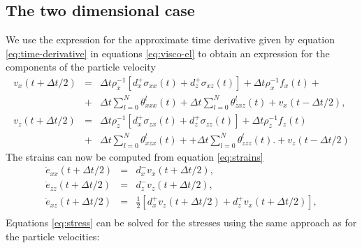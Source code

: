 \documentclass[11pt]{article}
\begin{document}
\subsection{The two dimensional case}
We use the expression for the approximate time derivative given by 
equation \eqref{eq:time-derivative}
in equations \eqref{eq:visco-el} to obtain an expression for the 
components of the particle velocity
\begin{eqnarray}
v_x(t+\Delta t/2) & = &  \Delta t\rho_x^{-1}\left[d^+_x \sigma_{xx}(t) 
                        +d^+_z \sigma_{xz}(t)\right] 
                        + \Delta t \rho_x^{-1}f_x(t) +            \nonumber\\ 
                  & + &  \Delta t \sum_{l=0}^N\theta^l_{xxx}(t) +   
                         \Delta t \sum_{l=0}^N\theta^l_{zxz}(t)
                        +v_x(t-\Delta t/2),\nonumber\\
v_z(t+\Delta t/2) & = &  \Delta t \rho_z^{-1}\left[d^+_x \sigma_{zx}(t) 
                        +d^+_z \sigma_{zz}(t)\right] 
                        +\Delta t \rho_z^{-1}f_z(t)\nonumber\\  
                  & + &  \Delta t\sum_{l=0}^N\theta^l_{xzx}(t) +  
                        +\Delta t\sum_{l=0}^N\theta^l_{zzz}(t)  \nonumber.
                        +v_z(t-\Delta t/2) 
                       \label{eq:vi-2d}
\end{eqnarray}
The strains can now be computed from equation \eqref{eq:strains}
\begin{eqnarray}
  \dot{e}_{xx}(t+\Delta t/2) & = & d^-_x v_x(t+\Delta t/2),     \nonumber  \\
  \dot{e}_{zz}(t+\Delta t/2) & = & d^-_z v_z(t+\Delta t/2),     \nonumber  \\
  \dot{e}_{xz}(t+\Delta t/2) & = & \frac{1}{2}\left[d^+_x v_z(t+\Delta t/2) 
                             + d^+_z v_x(t+\Delta t/2)\right], \nonumber   \\
                       \label{eq:strain2d}
\end{eqnarray}
%
Equations \eqref{eq:stress}   can be solved for the stresses using 
the same approach as for the particle velocities:
\end{document}
